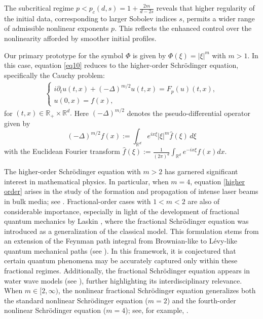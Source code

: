 \documentclass[a4paper,11pt, reqno]{amsart}
\theoremstyle{definition}
\theoremstyle{remark}
\numberwithin{equation}{section}
\begin{document}
	The subcritical regime $p < p_c(d, s) = 1 + \frac{2m}{d - 2s}$ reveals that higher regularity of the initial data, corresponding to larger Sobolev indices $s$, permits a wider range of admissible nonlinear exponents $p$. This reflects the enhanced control over the nonlinearity afforded by smoother initial profiles. 

Our primary prototype for the symbol $\Phi$ is given by $\Phi(\xi) = |\xi|^m$ with $m > 1$. In this case, equation \eqref{eq10} reduces to the higher-order  Schr\"odinger equation, specifically the Cauchy problem:
	\begin{align}\label{higher order}
		\begin{cases}
i\partial_t u (t, x) + (-\Delta)^{m/2} u (t, x) = F_p(u)(t, x), \\
u(0, x) = f(x),
\end{cases}
	\end{align}
    for $(t, x) \in \mathbb{R}_+ \times \mathbb{R}^d.$ Here $(-\Delta)^{m/2}$ denotes the pseudo-differential operator given by 
    $$(-\Delta)^{m/2} f(x):= \int_{\mathbb{R}^d} e^{i x\xi} |\xi|^m \widehat{f}(\xi) \,d\xi$$
    with the Euclidean Fourier transform  $\widehat{f}(\xi):= \frac{1}{(2\pi)^d} \int_{\mathbb{R}^d} e^{-i x\xi} f(x) dx.$


The higher-order Schr\"odinger equation with $m > 2$ has garnered significant interest in mathematical physics. In particular, when $m = 4$, equation \eqref{higher order} arises in the study of the formation and propagation of intense laser beams in bulk media; see \cite{Ka96, KS00}.  Fractional-order cases with $1 < m < 2$ are also of considerable importance, especially in light of the development of fractional quantum mechanics by Laskin \cite{La00}, where the fractional Schr\"odinger equation was introduced as a generalization of the classical model. This formulation stems from an extension of the Feynman path integral from Brownian-like to L\'evy-like quantum mechanical paths (see \cite{La00, La02}). In this framework, it is conjectured that certain quantum phenomena may be accurately captured only within these fractional regimes. Additionally, the fractional Schr\"odinger equation appears in water wave models (see \cite{Waterwaveref}), further highlighting its interdisciplinary relevance. When $m \in [2, \infty)$, the nonlinear fractional Schr\"odinger equation  generalizes both the standard nonlinear Schr\"odinger equation ($m = 2$) and the fourth-order nonlinear Schr\"odinger equation ($m = 4$); see, for example, \cite{Paus07}. 
\end{document}
